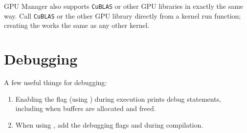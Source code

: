 \documentclass[10pt]{report}
\begin{document}
GPU Manager also supports \texttt{CuBLAS} or other GPU libraries in exactly the same way.
Call \texttt{CuBLAS} or the other GPU library directly from a kernel run function;
creating the  works the same as any other kernel.


\section{Debugging}

A few useful things for debugging:

\begin{enumerate}
\item Enabling the  flag
(using ) during execution prints debug
statements, including when buffers are allocated and freed.

\item When using , add the debugging flags  and
 during compilation.
\end{enumerate}

\ifstandalone
  
\end{document}
